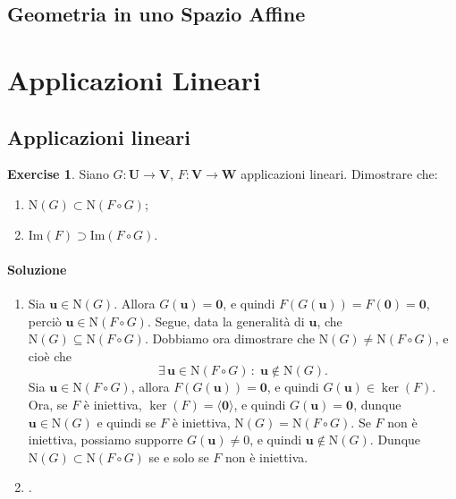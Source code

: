 \documentclass{article}
\theoremstyle{plain}
\theoremstyle{definition}
\newtheorem{xca}[exmp]{Exercise}
\theoremstyle{remark}
\begin{document}
\vspace{50pt}
\subsection{Geometria in uno Spazio Affine}
\vspace{20pt}

\newpage
\section{Applicazioni Lineari}
\vspace{20pt}


\subsection{Applicazioni lineari}
\vspace{20pt}


\begin{bxthm}
\begin{xca}
    Siano $G:\mathbf{U}\to\mathbf{V}$, $F:\mathbf{V}\to\mathbf{W}$ applicazioni lineari. Dimostrare che:
    \begin{enumerate}
        \item $\mathrm{N}(G)\subset \mathrm{N}(F\circ G)$;
        \item $\mathrm{Im}(F)\supset\mathrm{Im}(F\circ G)$.
    \end{enumerate}
\end{xca}
\end{bxthm}
\paragraph{Soluzione}
\begin{enumerate}
    \item Sia $\mathbf{u}\in\mathrm{N}(G)$. Allora $G(\mathbf{u})=\mathbf{0}$, e quindi $F(G(\mathbf{u}))=F(\mathbf{0})=\mathbf{0}$, perciò $\mathbf{u}\in \mathrm{N}(F\circ G)$. 
    Segue, data la generalità di $\mathbf{u}$, che $\mathrm{N}(G)\subseteq \mathrm{N}(F\circ G)$.
    Dobbiamo ora dimostrare che $\mathrm{N}(G)\neq \mathrm{N}(F\circ G)$, e cioè che 
    \[\exists\,\mathbf{u}\in \mathrm{N}(F\circ G)\,:\;\mathbf{u}\notin \mathrm{N}(G).\]
    Sia $\mathbf{u}\in \mathrm{N}(F\circ G)$, allora $F(G(\mathbf{u}))=\mathbf{0}$, e quindi $G(\mathbf{u})\in \ker(F)$.
    Ora, se $F$ è iniettiva, $\ker(F)=\langle\mathbf{0}\rangle$, e quindi $G(\mathbf{u})=\mathbf{0}$, dunque $\mathbf{u}\in \mathrm{N}(G)$ e quindi se $F$ è iniettiva, $\mathrm{N}(G)=\mathrm{N}(F\circ G)$.
    Se $F$ non è iniettiva, possiamo supporre $G(\mathbf{u})\neq 0$, e quindi $\mathbf{u}\notin \mathrm{N}(G)$.
    Dunque $\mathrm{N}(G)\subset \mathrm{N}(F\circ G)$ se e solo se $F$ non è iniettiva.
    \item .
\end{enumerate}
\end{document}
